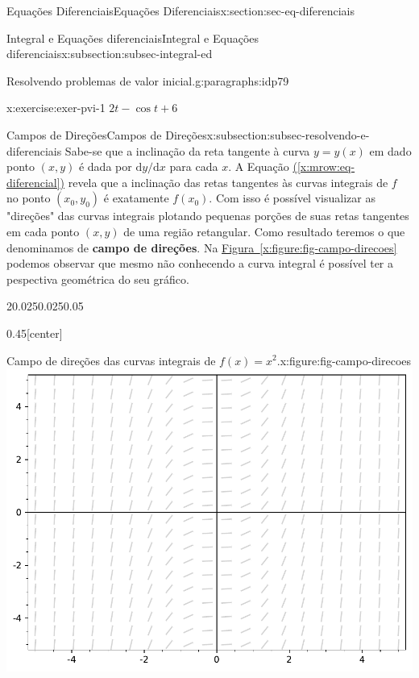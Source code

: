 \documentclass[oneside,10pt,]{article}
\newcommand{\xreffont}{\relax}
\newcommand{\terminology}[1]{\textbf{#1}}
\numberwithin{equation}{section}
\newcommand{\dd}{\mathrm{d}}
\begin{document}
\begin{sectionptx}{Equações Diferenciais}{}{Equações Diferenciais}{}{}{x:section:sec-eq-diferenciais}
\begin{subsectionptx}{Integral e Equações diferenciais}{}{Integral e Equações diferenciais}{}{}{x:subsection:subsec-integral-ed}
\begin{paragraphs}{Resolvendo problemas de valor inicial.}{g:paragraphs:idp79}
\begin{inlineexercise}{}{x:exercise:exer-pvi-1}
\noindent\(2t-\cos{t} + 6\)%
\end{inlineexercise}%
\end{paragraphs}%
\end{subsectionptx}
%
%
\typeout{************************************************}
\typeout{************************************************}
%
\begin{subsectionptx}{Campos de Direções}{}{Campos de Direções}{}{}{x:subsection:subsec-resolvendo-e-diferenciais}
Sabe-se que a inclinação da reta tangente à curva  \(y=y(x)\) em dado ponto \((x, y)\) é dada por \(\dd y/\dd x\) para cada \(x\). A Equação \hyperref[x:mrow:eq-diferencial]{({\xreffont\ref{x:mrow:eq-diferencial}})} revela que a inclinação das retas tangentes às curvas integrais de \(f\) no ponto \((x_0, y_0)\) é exatamente  \(f(x_0)\). Com isso é possível visualizar as "direções" das curvas integrais plotando pequenas porções de suas retas tangentes em cada ponto \((x,y)\)  de uma região retangular. Como resultado teremos o que denominamos de \terminology{campo de direções}. Na \hyperref[x:figure:fig-campo-direcoes]{Figura~{\xreffont\ref{x:figure:fig-campo-direcoes}}\textendash{}{\xreffont\ref{x:figure:fig-campo-direcoes-curva}}} podemos observar que  mesmo não conhecendo a curva integral é possível ter a pespectiva geométrica do seu gráfico.%
\begin{sidebyside}{2}{0.025}{0.025}{0.05}%
\begin{sbspanel}{0.45}[center]%
\begin{figureptx}{Campo de direções das curvas integrais de \(f(x)=x^2\).}{x:figure:fig-campo-direcoes}{}%
%
{\includegraphics[width=\linewidth]{images/sageplot-campo-direcoes.pdf}}%

\end{figureptx}
\end{sbspanel}
\end{sidebyside}
\end{subsectionptx}
\end{sectionptx}
\end{document}
